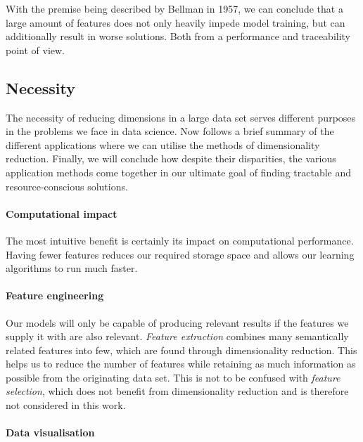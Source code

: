 With the premise being described by Bellman in 1957, we can conclude that a large amount of features does not only heavily impede model training, but can additionally result in worse solutions. \cite{HandsOnMLCh8}
Both from a performance and traceability point of view.

\vfill

\clearpage


\subsection{Necessity}

The necessity of reducing dimensions in a large data set serves different purposes in the problems we face in data science. 
Now follows a brief summary of the different applications where we can utilise the methods of dimensionality reduction. 
Finally, we will conclude how despite their disparities, the various application methods come together in our ultimate goal of finding tractable and resource-conscious solutions.

\paragraph{Computational impact}

The most intuitive benefit is certainly its impact on computational performance.
Having fewer features reduces our required storage space and allows our learning algorithms to run much faster. \cite{PythonMachineLearningCh1}

\paragraph{Feature engineering}

Our models will only be capable of producing relevant results if the features we supply it with are also relevant. \cite{HandsOnMLCh1}
\emph{Feature extraction} combines many semantically related features into few, which are found through dimensionality reduction. 
This helps us to reduce the number of features while retaining as much information as possible from the originating data set.
This is not to be confused with \emph{feature selection}, which does not benefit from dimensionality reduction and is therefore not considered in this work.

\paragraph{Data visualisation}

